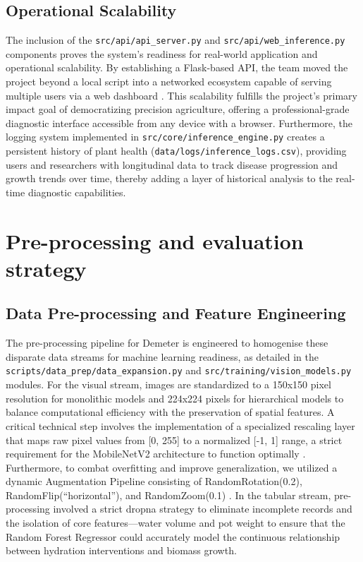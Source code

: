 \documentclass[11pt,a4paper]{article}
\begin{document}
\subsection{Operational Scalability}
The inclusion of the \texttt{src/api/api\_server.py} and \texttt{src/api/web\_inference.py} components proves the system’s readiness for real-world application and operational scalability. By establishing a Flask-based API, the team moved the project beyond a local script into a networked ecosystem capable of serving multiple users via a web dashboard \cite{sharma2024}. This scalability fulfills the project's primary impact goal of democratizing precision agriculture, offering a professional-grade diagnostic interface accessible from any device with a browser. Furthermore, the logging system implemented in \texttt{src/core/inference\_engine.py} creates a persistent history of plant health (\texttt{data/logs/inference\_logs.csv}), providing users and researchers with longitudinal data to track disease progression and growth trends over time, thereby adding a layer of historical analysis to the real-time diagnostic capabilities.

\section{Pre-processing and evaluation strategy}\label{sec:prep}
\subsection{Data Pre-processing and Feature Engineering}
The pre-processing pipeline for Demeter is engineered to homogenise these disparate data streams for machine learning readiness, as detailed in the \texttt{scripts/data\_prep/data\_expansion.py} and \texttt{src/training/vision\_models.py} modules. For the visual stream, images are standardized to a 150x150 pixel resolution for monolithic models and 224x224 pixels for hierarchical models to balance computational efficiency with the preservation of spatial features. A critical technical step involves the implementation of a specialized rescaling layer that maps raw pixel values from [0, 255] to a normalized [-1, 1] range, a strict requirement for the MobileNetV2 architecture to function optimally \cite{paul2024}. Furthermore, to combat overfitting and improve generalization, we utilized a dynamic Augmentation Pipeline consisting of RandomRotation(0.2), RandomFlip(``horizontal''), and RandomZoom(0.1) \cite{faryna2024}. In the tabular stream, pre-processing involved a strict dropna strategy to eliminate incomplete records and the isolation of core features—water volume and pot weight to ensure that the Random Forest Regressor could accurately model the continuous relationship between hydration interventions and biomass growth.
\end{document}
